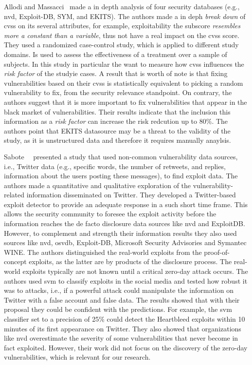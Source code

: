 Allodi and Massacci~\cite{Allodi:2014} made a in depth analysis of four security databases (e.g., \gls{nvd}, Exploit-DB, SYM, and EKITS). 
The authors made a in deph \emph{break down} of \gls{cvss} on its several attributes, for example, exploitability the subscore \emph{resembles more a constant than a variable}, thus not have a real impact on the \gls{cvss} score.
They used a randomized case-control study, which is applied to different study domains.
Is used to assess the effectiveness of a treatment over a sample of subjects.
In this study in particular the want to measure how \gls{cvss} influences the \emph{risk factor} of the studyie cases.
A result that is worth of note is that fixing vulnerabilities based on their \gls{cvss} is statistically equivalent to picking a random vulnerability to fix, from the security relevance standpoint.
On contrary, the authors suggest that it is more important to fix vulnerabilities that appear in the black market of vulnerabilities.
Their results indicate that the inclusion this information as a \emph{risk factor} can increase the risk redcution up to 80\%.
The authors point that EKITS datasource may be a threat to the validity of the study, as it is unstructured data and therefore it requires manually anaylsis.

Sabote~\etal{}~\cite{Sabottke:2015} presented a study that used non-common vulnerability data sources, i.e., Twitter data (e.g., specific words, the number of retweets, and replies, information about
the users posting these messages), to find exploit data. 
The authors made a quantitative and qualitative exploration of the vulnerability-related information disseminated on Twitter.
They developed a Twitter-based exploit detector to provide an adequate response in a such short time frame. 
This allows the security community to foresee the exploit activity before the information reaches the de facto disclosure data sources like \gls{nvd} and ExploitDB.
However, to complement and strength their information results they also used sources like \gls{nvd}, \gls{osvdb}, Exploit-DB, Microsoft Security Advisories and Symantec WINE. 
The authors distinguished the real-world exploits from the proof-of-concept exploits, as the latter are by products of the disclosure process. 
The real-world exploits typically are not known until a critical zero-day attack occurs. 
The authors used \gls{svm} to classify exploits in the social media and tested how robust it was to attacks, i.e., if a powerful attack could manipulate the information on Twitter with a false account and false data. 
The results showed that with their proposal they could be confident with the predictions. 
For example, the \gls{svm} classifier set to a precision of 25\% could detect the Heartbleed exploits within 10 minutes of its first appearance on Twitter. 
They also showed that organizations like \gls{nvd} overestimate the severity of some vulnerabilities that never become in fact exploited.
However, their work did not focus on the discovery of the zero-day vulnerabilities, which is relevant for our research.



